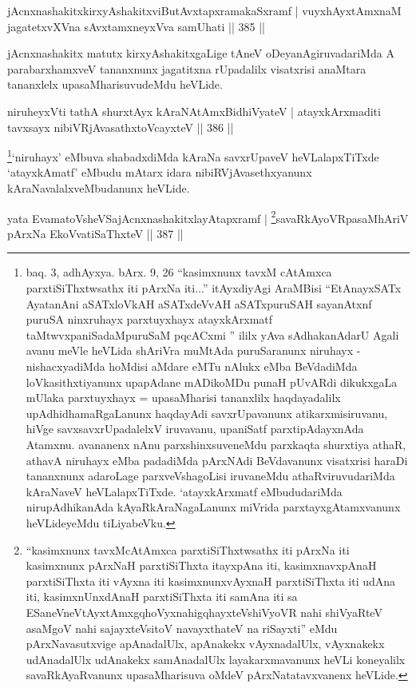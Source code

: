 \begin{shl}
jAcnxnashakitxkirxyAshakitxviButAvxtapxramakaSxramf |
vuyxhAyx\s \s tAmxnaM jagatetxvXVna sAvxtamxneyxVva samUhati \hfill || 385 ||
\end{shl}

\begin{artha}
jAcnxnashakitx matutx kirxyAshakitxgaLige tAneV oDeyanAgiruvadariMda A parabarxhamxveV tananxnunx jagatitxna rUpadalilx visatxrisi anaMtara tananxlelx upasaMharisuvudeMdu heVLide.
\end{artha}


\begin{shl}
niruheyxVti tathA shurxtAyx kAraNAtAmx\s BidhiVyateV |
atayxkArxmaditi tavxsayx nibiVRjAvasathxtoVcayxteV \hfill || 386 ||
\end{shl}

\begin{artha}
\footnote{baq. 3, adhAyxya. bArx. 9, 26 \mdash ``kasimxnunx tavxM cAtAmxca parxtiSiThxtwsathx iti pArxNa iti...'' itAyxdiyAgi AraMBisi ``EtAnayxSATx AyatanAni aSATxloVkAH aSATxdeVvAH aSATxpuruSAH sayanAtxnf puruSA ninxruhayx parxtuyxhayx atayxkArxmatf taMtwvxpaniSadaMpuruSaM pqcACxmi '' \mdash ililx yAva sAdhakanAdarU Agali avanu meVle heVLida shAriVra muMtAda puruSaranunx niruhayx - nishacxyadiMda hoMdisi aMdare eMTu nAlukx eMba BeVdadiMda loVkasithxtiyanunx upapAdane mADikoMDu punaH pUvARdi dikukxgaLa mUlaka parxtuyxhayx = upasaMharisi tananxlilx haqdayadalilx upAdhidhamaRgaLanunx haqdayAdi savxrUpavanunx atikarxmisiruvanu, hiVge savxsavxrUpadalelxV iruvavanu, upaniSatf parxtipAdayxnAda Atamxnu. avananenx nAnu parxshinxsuveneMdu parxkaqta shurxtiya athaR, athavA niruhayx eMba padadiMda pArxNAdi BeVdavanunx visatxrisi haraDi tananxnunx adaroLage parxveVshagoLisi iruvaneMdu athaRviruvudariMda kAraNaveV heVLalapxTiTxde. `atayxkArxmatf eMbududariMda nirupAdhikanAda kAyaRkAraNagaLanunx miVrida parxtayxgAtamxvanunx heVLideyeMdu tiLiyabeVku.}`niruhayx' eMbuva shabadxdiMda kAraNa savxrUpaveV heVLalapxTiTxde `atayxkAmatf' eMbudu mAtarx idara nibiRVjAvasethxyanunx kAraNavalalxveMbudanunx heVLide.
\end{artha}

\begin{shl}
yata EvamatoV\s sheVSajAcnxnashakitxlayAtapxramf |
\footnote{``kasimxnunx tavxMcA\s\s tAmxca parxtiSiThxtwsathx iti pArxNa iti kasimxnunx pArxNaH parxtiSiThxta itayxpAna iti, kasimxnavxpAnaH parxtiSiThxta iti vAyxna iti kasimxnunxvAyxnaH parxtiSiThxta iti udAna iti, kasimxnUnxdAnaH parxtiSiThxta iti samAna iti sa ESaneVneVtAyxtAmx\s gqhoVyxnahigqhayxteV\s shiVyoVR nahi shiVyaRteV asaMgoV nahi sajayxteV\s sitoV navayxthateV na riSayxti'' eMdu pArxNavasutxvige apAnadalUlx, apAnakekx vAyxnadalUlx, vAyxnakekx udAnadalUlx udAnakekx samAnadalUlx layakarxmavanunx heVLi koneyalilx savaRkAyaRvanunx upasaMharisuva oMdeV pArxNatatavxvanenx heVLide.}savaRkAyoVRpasaMhAriV pArxNa EkoV\s vatiSaThxteV \hfill || 387 ||
\end{shl}

